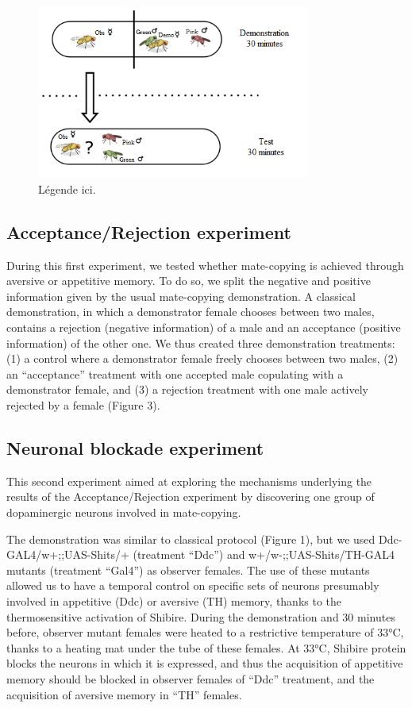 \documentclass[a4paper, 12pt]{article}
\begin{document}
	\begin{figure}
	\centering
	\includegraphics[width=0.8\textwidth]{images/classic}
	\caption{Légende ici.}
	\label{fig:Classic protocol}
	\end{figure}

	\subsection{Acceptance/Rejection experiment}
	
	During this first experiment, we tested whether mate-copying is achieved through aversive or appetitive memory. To do so, we split the negative and positive information given by the usual mate-copying demonstration. A classical demonstration, in which a demonstrator female chooses between two males, contains a rejection (negative information) of a male and an acceptance (positive information) of the other one. We thus created three demonstration treatments: (1) a control where a demonstrator female freely chooses between two males, (2) an “acceptance” treatment with one accepted male copulating with a demonstrator female, and (3) a rejection treatment with one male actively rejected by a female (Figure 3).
	
	\subsection{Neuronal blockade experiment}
	
	This second experiment aimed at exploring the mechanisms underlying the results of the Acceptance/Rejection experiment by discovering one group of dopaminergic neurons involved in mate-copying.
	
	The demonstration was similar to classical protocol (Figure 1), but we used Ddc-GAL4/w+;;UAS-Shits/+ (treatment “Ddc”) and w+/w-;;UAS-Shits/TH-GAL4 mutants (treatment “Gal4”) as observer females. The use of these mutants allowed us to have a temporal control on specific sets of neurons presumably involved in appetitive (Ddc) or aversive (TH) memory, thanks to the thermosensitive activation of Shibire. During the demonstration and 30 minutes before, observer mutant females were heated to a restrictive temperature of 33°C, thanks to a heating mat under the tube of these females. At 33°C, Shibire protein blocks the neurons in which it is expressed, and thus the acquisition of appetitive memory should be blocked in observer females of “Ddc” treatment, and the acquisition of aversive memory in “TH” females. 
	
\end{document}
